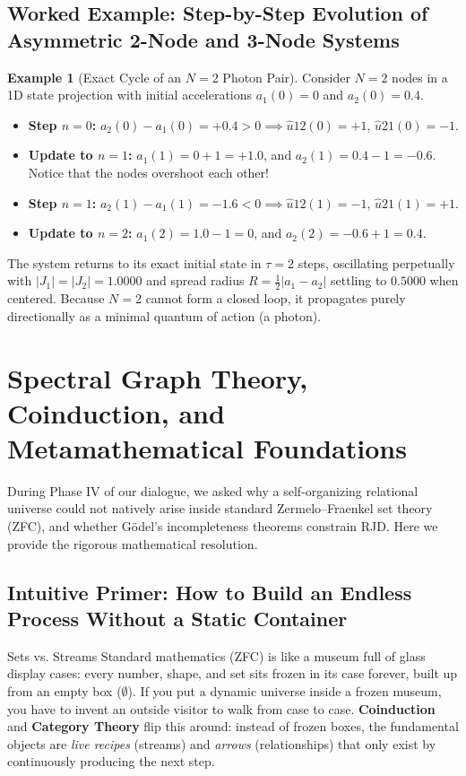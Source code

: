\documentclass[11pt,a4paper]{article}
\theoremstyle{plain}
\theoremstyle{definition}
\newtheorem{example}{Example}[section]
\theoremstyle{remark}
\begin{document}
\subsection{Worked Example: Step-by-Step Evolution of Asymmetric 2-Node and 3-Node Systems}
\begin{example}[Exact Cycle of an $N=2$ Photon Pair]
Consider $N=2$ nodes in a 1D state projection with initial accelerations $a_1(0) = 0$ and $a_2(0) = 0.4$.
\begin{itemize}
\item \textbf{Step $n=0$:} $a_2(0) - a_1(0) = +0.4 > 0 \implies \hat{u}{12}(0) = +1$, $\hat{u}{21}(0) = -1$.
\item \textbf{Update to $n=1$:} $a_1(1) = 0 + 1 = +1.0$, and $a_2(1) = 0.4 - 1 = -0.6$. Notice that the nodes overshoot each other!
\item \textbf{Step $n=1$:} $a_2(1) - a_1(1) = -1.6 < 0 \implies \hat{u}{12}(1) = -1$, $\hat{u}{21}(1) = +1$.
\item \textbf{Update to $n=2$:} $a_1(2) = 1.0 - 1 = 0$, and $a_2(2) = -0.6 + 1 = 0.4$.
\end{itemize}
The system returns to its exact initial state in $\tau = 2$ steps, oscillating perpetually with $|J_1| = |J_2| = 1.0000$ and spread radius $R = \frac{1}{2}|a_1 - a_2|$ settling to $0.5000$ when centered. Because $N=2$ cannot form a closed loop, it propagates purely directionally as a minimal quantum of action (a photon).
\end{example}
\section{Spectral Graph Theory, Coinduction, and Metamathematical Foundations}
\label{sec:dimensionality}
During Phase IV of our dialogue, we asked why a self-organizing relational universe could not natively arise inside standard Zermelo--Fraenkel set theory (ZFC), and whether Gödel's incompleteness theorems constrain RJD. Here we provide the rigorous mathematical resolution.
\subsection{Intuitive Primer: How to Build an Endless Process Without a Static Container}
\begin{noobbox}{Sets vs. Streams}
Standard mathematics (ZFC) is like a museum full of glass display cases: every number, shape, and set sits frozen in its case forever, built up from an empty box ($\emptyset$). If you put a dynamic universe inside a frozen museum, you have to invent an outside visitor to walk from case to case. \textbf{Coinduction} and \textbf{Category Theory} flip this around: instead of frozen boxes, the fundamental objects are \textit{live recipes} (streams) and \textit{arrows} (relationships) that only exist by continuously producing the next step.
\end{noobbox}
\end{document}

